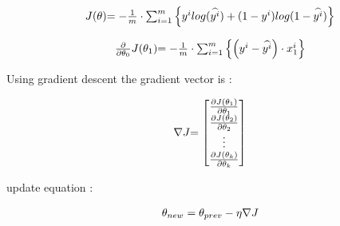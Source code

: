 \[
	\begin{array}{ l@{} l@{} } 
		J(\theta)
		& =
		-
		\frac{1}{m}
		\cdot
		\sum_{i=1}^{m}
		\left\{
			y^{i}
			log(\widehat{y^{i}})
			+
			(1 - y^{i})
			log(1-\widehat{y^{i}})
		\right\}
	\end{array}
\]

\[
	\begin{array}{ l@{} l@{} } 
		\frac{\partial}{\partial \theta_0} J(\theta_1)
		& =
		-
		\frac{1}{m}
		\cdot 
		\sum_{i=1}^m
		\left\{
			\left(
				y^{i} - \widehat{y^{i}}
			\right)
			\cdot
			x_{1}^{i}
		\right\} 
	\end{array}
\]

Using gradient descent the gradient vector is :

\[
	\begin{array}{ l@{} l@{} } 
		\nabla J
		& = 
		\begin{bmatrix} 
			\frac{\partial J(\theta_1)}{\partial \theta_1}  \\ 
			\frac{\partial J(\theta_2)}{\partial \theta_2}  \\ 
			\vdots \\ 
			\frac{\partial J(\theta_k)}{\partial \theta_k}  \\ 
		\end{bmatrix} 
	\end{array}
\]

update equation :

\[
	\begin{array}{ l@{} l@{} } 
	\theta_{new} = \theta_{prev} - \eta \nabla J 
	\end{array}
\]











